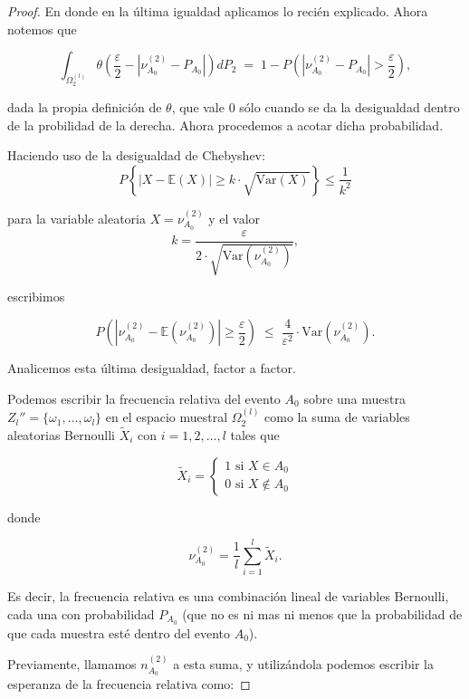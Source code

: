 \documentclass{report}
\begin{document}
\begin{proof}
En donde en la última igualdad aplicamos lo recién explicado. Ahora notemos que

\begin{equation}\label{eq: theta como probabilidad}
    \int_{ \Omega_2^{(l)}}  \theta\left(\frac{\varepsilon}{2} - |\nu^{(2)}_{A_0}-P_{A_0}|\right) dP_2 \;=\; 1 - P\left(|\nu^{(2)}_{A_0}-P_{A_0}|>\frac{\varepsilon}{2}\right),
\end{equation}


dada la propia definición de $\theta$, que vale $0$ sólo cuando se da la desigualdad dentro de la probilidad de la derecha. Ahora procedemos a acotar dicha probabilidad.

Haciendo uso de la desigualdad de Chebyshev:
\[
P\left\{|X- \mathbb{E}\left(X \right)| \geq k \cdot \sqrt{\text{Var}(X)} \right\} \leq \frac{1}{k^2}
\]

para la variable aleatoria $X=\nu_{A_0}^{(2)}$ y el valor
\[
k= \frac{\varepsilon}{2\cdot\sqrt{\text{Var}\left(\nu_{A_0}^{(2)}\right)}}   ,
\]

escribimos

\begin{equation}
P\left(|\nu_{A_0}^{(2)} - \mathbb{E}\left(\nu_{A_0}^{(2)} \right)| \geq \frac{\varepsilon}{2}\right)
\;\leq\; \frac{4}{\varepsilon^2}\cdot \text{Var}\left(\nu_{A_0}^{(2)}\right). \label{Chebyshev aplicada a frecuencia relativa}
\end{equation}
\bigskip

Analicemos esta última desigualdad, factor a factor.

Podemos escribir la frecuencia relativa del evento $A_0$ sobre una muestra $Z_l''=\{\omega_1,\ldots,\omega_l\}$ en el espacio muestral $\Omega^{(l)}_2$ como la suma de variables aleatorias
Bernoulli $\tilde{X}_i$ con $i=1,2,\dots,l$ tales que

\[
    \tilde{X}_i = \begin{cases} 1 \text{ si } X\in A_0\\
        0 \text{ si } X\notin A_0
\end{cases}
\]

donde

\[
    \nu_{A_0}^{(2)} = \frac{1}{l}\sum_{i=1}^l \tilde{X}_i.
\]

Es decir, la frecuencia relativa es una combinación lineal de variables Bernoulli, cada una con probabilidad $P_{A_0}$ (que no es ni mas ni
menos que la probabilidad de que cada muestra esté dentro del evento $A_0$).

Previamente, llamamos $n_{A_0}^{(2)}$ a esta suma, y utilizándola podemos escribir la esperanza de la frecuencia relativa como:


\end{proof}
\end{document}
